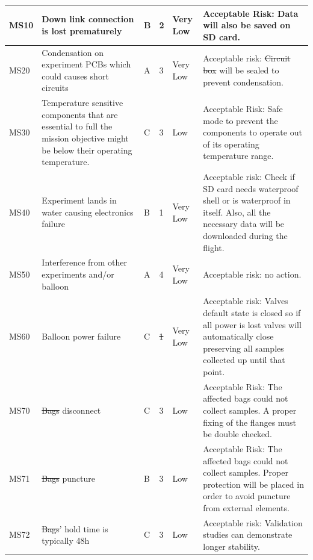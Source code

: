 \documentclass[a4paper,12pt,twoside, final]{article}
\providecommand{\DIFaddtex}[1]{{\protect\color{blue}\uwave{#1}}} %
\providecommand{\DIFdeltex}[1]{{\protect\color{red}\sout{#1}}}                      %
\providecommand{\DIFaddbegin}{} %
\providecommand{\DIFaddend}{} %
\providecommand{\DIFdelbegin}{} %
\providecommand{\DIFdelend}{} %
\providecommand{\DIFadd}[1]{\texorpdfstring{\DIFaddtex{#1}}{#1}} %
\providecommand{\DIFdel}[1]{\texorpdfstring{\DIFdeltex{#1}}{}} %
\newcommand{\DIFscaledelfig}{0.5}
\newlength{\DIFdelgraphicswidth} %
\newlength{\DIFdelgraphicsheight} %
\newcommand{\DIFaddincludegraphics}[2][]{{\color{blue}\fbox{\DIFOincludegraphics[#1]{#2}}}} %
\newcommand{\DIFdelincludegraphics}[2][]{%
\sbox{\DIFdelgraphicsbox}{\DIFOincludegraphics[#1]{#2}}%
\settoboxwidth{\DIFdelgraphicswidth}{\DIFdelgraphicsbox} %
\settoboxtotalheight{\DIFdelgraphicsheight}{\DIFdelgraphicsbox} %
\scalebox{\DIFscaledelfig}{%
\parbox[b]{\DIFdelgraphicswidth}{\usebox{\DIFdelgraphicsbox}\\[-\baselineskip] \rule{\DIFdelgraphicswidth}{0em}}\llap{\resizebox{\DIFdelgraphicswidth}{\DIFdelgraphicsheight}{%
\setlength{\unitlength}{\DIFdelgraphicswidth}%
\begin{picture}(1,1)%
\thicklines\linethickness{2pt} %
{\color[rgb]{1,0,0}\put(0,0){\framebox(1,1){}}}%
{\color[rgb]{1,0,0}\put(0,0){\line( 1,1){1}}}%
{\color[rgb]{1,0,0}\put(0,1){\line(1,-1){1}}}%
\end{picture}%
}\hspace*{3pt}}} %
} %
\DeclareRobustCommand{\DIFaddbegin}{\DIFOaddbegin \let\includegraphics\DIFaddincludegraphics} %
\DeclareRobustCommand{\DIFaddend}{\DIFOaddend \let\includegraphics\DIFOincludegraphics} %
\DeclareRobustCommand{\DIFdelbegin}{\DIFOdelbegin \let\includegraphics\DIFdelincludegraphics} %
\DeclareRobustCommand{\DIFdelend}{\DIFOaddend \let\includegraphics\DIFOincludegraphics} %
\begin{document}
\begin{landscape}
\begin{longtable}{|m{}| m{} |m{} |m{}|m{}| m{}|}
\DIFaddend MS10 & Down link connection is lost prematurely & B & 2 & \cellcolor[HTML]{34FF34}Very Low & Acceptable Risk: Data will also be saved on SD card. \\ \hline
MS20 & Condensation on experiment PCBs which could causes short circuits & A & 3 & \cellcolor[HTML]{34FF34}Very Low & Acceptable risk: \DIFdelbegin \DIFdel{Circuit box }\DIFdelend \DIFaddbegin \DIFadd{The Brain }\DIFaddend will be sealed to prevent condensation. \\ \hline
MS30 & Temperature sensitive components that are essential to full the mission objective might be below their operating temperature. & C & 3 & \cellcolor[HTML]{FCFF2F}Low & Acceptable Risk: Safe mode to prevent the components to operate out of its operating temperature range. \\ \hline
MS40 & Experiment lands in water causing electronics failure & B & 1 & \cellcolor[HTML]{34FF34}Very Low & Acceptable risk: Check if SD card needs waterproof shell or is waterproof in itself. Also, all the necessary data will be downloaded during the flight. \\ \hline
MS50 & Interference from other experiments and/or balloon & A & 4 & \cellcolor[HTML]{34FF34}Very Low & Acceptable risk: no action. \\ \hline
MS60 & Balloon power failure & C & \DIFdelbegin \DIFdel{1 }\DIFdelend \DIFaddbegin \DIFadd{2 }\DIFaddend & \cellcolor[HTML]{34FF34}Very Low & Acceptable risk: Valves default state is closed so if all power is lost valves will automatically close preserving all samples collected up until that point. \\ \hline
MS70 & \DIFdelbegin \DIFdel{Bags }\DIFdelend \DIFaddbegin \DIFadd{Sampling bags }\DIFaddend disconnect & C & 3 & \cellcolor[HTML]{FCFF2F}Low & Acceptable Risk: The affected bags could not collect samples. A proper fixing of the flanges must be double checked.
\\ \hline
MS71 & \DIFdelbegin \DIFdel{Bags }\DIFdelend \DIFaddbegin \DIFadd{Sampling bags }\DIFaddend puncture & B & 3 & \cellcolor[HTML]{FCFF2F}Low & Acceptable Risk: The affected bags could not collect samples. Proper protection will be placed in order to avoid puncture from external elements. \\ \hline
MS72 & \DIFdelbegin \DIFdel{Bags}\DIFdelend \DIFaddbegin \DIFadd{Sampling bags}\DIFaddend ' hold time is typically 48h & C & 3 & \cellcolor[HTML]{FCFF2F}Low & Acceptable risk: Validation studies can demonstrate longer stability.  \\ \hline

\end{longtable}
\end{landscape}
\end{document}
